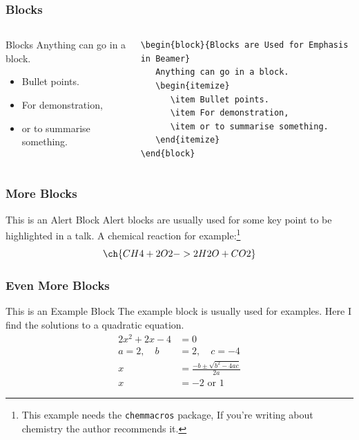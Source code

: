 \documentclass[aspectratio=1610]{beamer}
\begin{document}
\begin{frame}[fragile]
\frametitle{Blocks}
   \begin{columns}
      \begin{column}{0.48\textwidth}
         \begin{block}{Blocks}
            Anything can go in a block.
            \begin{itemize}
               \item Bullet points.
               \item For demonstration,
               \item or to summarise something.
            \end{itemize}
         \end{block}
      \end{column}
      \begin{column}{0.48\textwidth}
         \footnotesize
         \begin{verbatim}
\begin{block}{Blocks are Used for Emphasis in Beamer}
   Anything can go in a block.
   \begin{itemize}
      \item Bullet points.
      \item For demonstration,
      \item or to summarise something.
   \end{itemize}
\end{block}
         \end{verbatim}
      \end{column}
   \end{columns}
\end{frame}


\begin{frame}
\frametitle{More Blocks}
   \begin{alertblock}{This is an Alert Block}
      Alert blocks are usually used for some key point to be highlighted in a talk.
      A chemical reaction for example:\footnote{This example needs the \texttt{chemmacros} package, If you're writing about chemistry the author recommends it.}
      \begin{equation}
         \ch{CH4 + 2 O2 -> 2 H2O + CO2}
      \end{equation}
   \end{alertblock}
\end{frame}


\begin{frame}
\frametitle{Even More Blocks}
   \begin{exampleblock}{This is an Example Block}
      The example block is usually used for examples. Here I find the solutions to a quadratic equation.
      \begin{align*}
         2x^2 + 2x - 4 & = 0 \\
         a=2, \quad b & =2, \quad c=-4\\
         x & =\frac{-b\pm\sqrt{b^2-4ac}}{2a} \\
         x & =-2 \text{ or } 1
      \end{align*}
   \end{exampleblock}
\end{frame}
\end{document}
